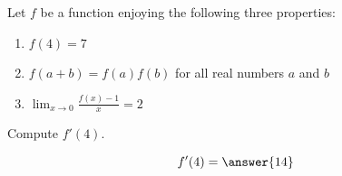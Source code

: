 \documentclass{ximera}
\author{Steven Gubkin}
\begin{document}
\begin{exercise}



Let $f$ be a function enjoying the following three properties:

\begin{enumerate}
 \item $f(4) = 7$
\item $f(a+b) = f(a)f(b)$ for all real numbers $a$ and $b$
\item $\lim_{x \to 0} \frac{f(x) - 1}{x} = 2$
\end{enumerate}

Compute $f'(4)$.

\begin{prompt}
	\[
	f'(4) = \answer{14}
	\]
\end{prompt}

\end{exercise}
\end{document}

